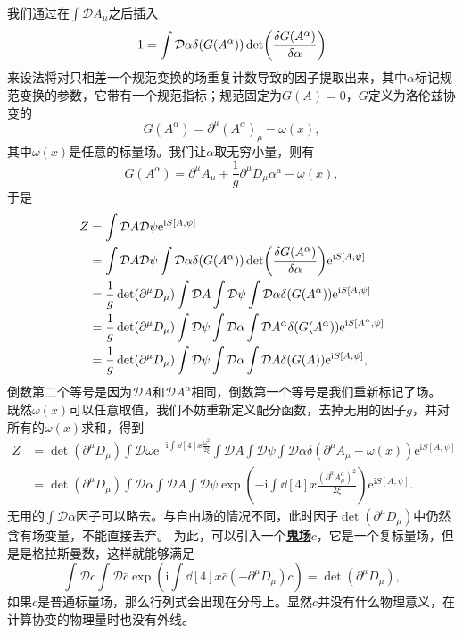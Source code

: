 \documentclass[hyperref, UTF8, a4paper]{ctexart}
\newcommand*{\ii}{\mathrm{i}}
\newcommand*{\ee}{\mathrm{e}}
\newcommand*{\fd}[1]{{\mathcal{D} #1}}
\newcommand{\concept}[1]{\underline{\textbf{#1}}}
\begin{document}
我们通过在$\int \fd{A_\mu}$之后插入
\[
    1 = \int \fd{\alpha} \delta(G(A^\alpha)) \det(\fdv{G(A^\alpha)}{\alpha})
\]
来设法将对只相差一个规范变换的场重复计数导致的因子提取出来，其中$\alpha$标记规范变换的参数，它带有一个规范指标；规范固定为$G(A)=0$，$G$定义为洛伦兹协变的
\begin{equation}
    G(A^\alpha) = \partial^\mu (A^\alpha)_\mu - \omega(x),
\end{equation}
其中$\omega(x)$是任意的标量场。我们让$\alpha$取无穷小量，则有
\[
    G(A^\alpha) = \partial^\mu A_\mu + \frac{1}{g} \partial^\mu D_\mu \alpha^a - \omega(x),
\]
于是
\[
    \begin{aligned}
        Z &= \int \fd{A} \fd{\psi} \ee^{\ii S[A, \psi]} \\
        &= \int \fd{A} \fd{\psi} \int \fd{\alpha} \delta(G(A^\alpha)) \det(\fdv{G(A^\alpha)}{\alpha}) \ee^{\ii S[A, \psi]} \\
        &= \frac{1}{g} \det(\partial^\mu D_\mu) \int \fd{A} \int \fd{\psi} \int \fd{\alpha} \delta(G(A^\alpha)) \ee^{\ii S[A, \psi]} \\
        &= \frac{1}{g} \det(\partial^\mu D_\mu) \int \fd{\psi} \int \fd{\alpha} \int \fd{A^\alpha} \delta(G(A^\alpha)) \ee^{\ii S[A^\alpha, \psi]} \\
        &= \frac{1}{g} \det(\partial^\mu D_\mu) \int \fd{\psi} \int \fd{\alpha} \int \fd{A} \delta(G(A)) \ee^{\ii S[A, \psi]},
    \end{aligned}
\]
倒数第二个等号是因为$\fd{A}$和$\fd{A^\alpha}$相同，倒数第一个等号是我们重新标记了场。
既然$\omega(x)$可以任意取值，我们不妨重新定义配分函数，去掉无用的因子$g$，并对所有的$\omega(x)$求和，得到
\[
    \begin{aligned}
        Z &= \det(\partial^\mu D_\mu) \int \fd{\omega} \ee^{-\ii \int \dd[4]{x} \frac{\omega^2}{2 \xi}} \int \fd{A} \int \fd{\psi} \int \fd{\alpha} \delta(\partial^\mu A_\mu - \omega(x)) \ee^{\ii S[A, \psi]} \\
        &= \det(\partial^\mu D_\mu) \int \fd{\alpha} \int \fd{A} \int \fd{\psi} \exp(-\ii \int \dd[4]{x} \frac{(\partial^\mu A_\mu^a)^2}{2 \xi}) \ee^{\ii S[A, \psi]}.
    \end{aligned}
\]
无用的$\int \fd{\alpha}$因子可以略去。与自由场的情况不同，此时因子$\det(\partial^\mu D_\mu)$中仍然含有场变量，不能直接丢弃。
为此，可以引入一个\concept{鬼场}$c$，它是一个复标量场，但是是格拉斯曼数，这样就能够满足
\[
    \int \fd{c} \int \fd{\bar{c}} \exp(\ii \int \dd[4]{x} \bar{c} (- \partial^\mu D_\mu) c) = \det(\partial^\mu D_\mu),
\]
如果$c$是普通标量场，那么行列式会出现在分母上。显然$c$并没有什么物理意义，在计算协变的物理量时也没有外线。
\end{document}
